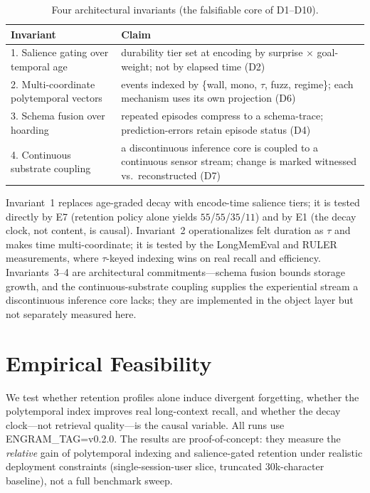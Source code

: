 \documentclass[letterpaper]{article}
\begin{document}
\begin{table}[t]\centering
\caption{Four architectural invariants (the falsifiable core of D1--D10).}
\label{tab:invariants}
\begin{tabular}{@{}p{2.9cm}p{5.1cm}@{}}
\toprule
Invariant & Claim \\
\midrule
1. Salience gating over temporal age & durability tier set at encoding by
surprise $\times$ goal-weight; not by elapsed time (D2) \\
2. Multi-coordinate polytemporal vectors & events indexed by
\{wall, mono, $\tau$, fuzz, regime\}; each mechanism uses its own projection (D6) \\
3. Schema fusion over hoarding & repeated episodes compress to a schema-trace;
prediction-errors retain episode status (D4) \\
4. Continuous substrate coupling & a discontinuous inference core is coupled to
a continuous sensor stream; change is marked witnessed vs.\ reconstructed (D7) \\
\bottomrule
\end{tabular}
\end{table}

Invariant~1 replaces age-graded decay with encode-time salience tiers; it is tested directly by E7 (retention policy alone yields $55$/$55$/$35$/$11$) and by E1 (the decay clock, not content, is causal). Invariant~2 operationalizes felt duration as $\tau$ and makes time multi-coordinate; it is tested by the LongMemEval and RULER measurements, where $\tau$-keyed indexing wins on real recall and efficiency. Invariants~3--4 are architectural commitments---schema fusion bounds storage growth, and the continuous-substrate coupling supplies the experiential stream a discontinuous inference core lacks; they are implemented in the object layer but not separately measured here.

\section{Empirical Feasibility}\label{sec:emp}
We test whether retention profiles alone induce divergent forgetting, whether the polytemporal index improves real long-context recall, and whether the decay clock---not retrieval quality---is the causal variable. All runs use ENGRAM\_TAG=v0.2.0. The results are proof-of-concept: they measure the \emph{relative} gain of polytemporal indexing and salience-gated retention under realistic deployment constraints (single-session-user slice, truncated $30$k-character baseline), not a full benchmark sweep.
\end{document}
